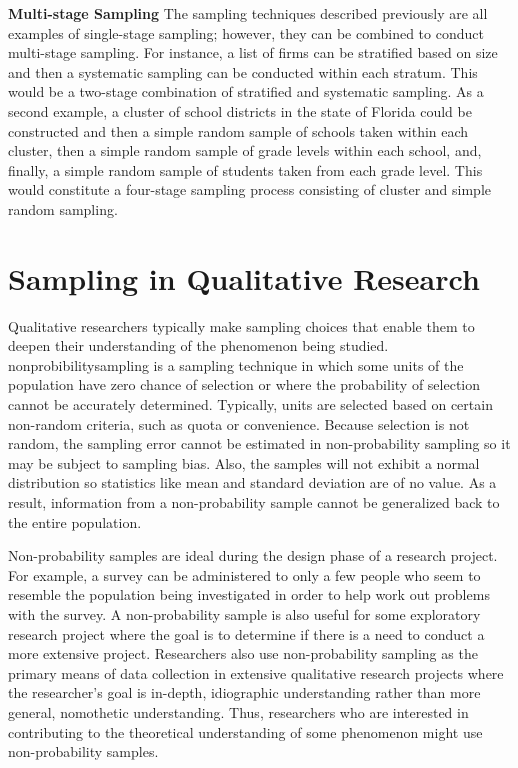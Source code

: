 \textbf{Multi-stage Sampling} The sampling techniques described previously are all examples of single-stage sampling; however, they can be combined to conduct multi-stage sampling. For instance, a list of firms can be stratified based on size and then a systematic sampling can be conducted within each stratum. This would be a two-stage combination of stratified and systematic sampling. As a second example, a cluster of school districts in the state of Florida could be constructed and then a simple random sample of schools taken within each cluster, then a simple random sample of grade levels within each school, and, finally, a simple random sample of students taken from each grade level. This would constitute a four-stage sampling process consisting of cluster and simple random sampling.

\section{Sampling in Qualitative Research}

Qualitative researchers typically make sampling choices that enable them to deepen their understanding of the phenomenon being studied. \Gls{nonprobibilitysampling} is a sampling technique in which some units of the population have zero chance of selection or where the probability of selection cannot be accurately determined. Typically, units are selected based on certain non-random criteria, such as quota or convenience. Because selection is not random, the sampling error cannot be estimated in non-probability sampling so it may be subject to sampling bias. Also, the samples will not exhibit a normal distribution so statistics like mean and standard deviation are of no value. As a result, information from a non-probability sample cannot be generalized back to the entire population. 

Non-probability samples are ideal during the design phase of a research project. For example, a survey can be administered to only a few people who seem to resemble the population being investigated in order to help work out problems with the survey. A non-probability sample is also useful for some exploratory research project where the goal is to determine if there is a need to conduct a more extensive project. Researchers also use non-probability sampling as the primary means of data collection in extensive qualitative research projects where the researcher's goal is in-depth, \gls{idiographic} understanding rather than more general, \gls{nomothetic} understanding. Thus, researchers who are interested in contributing to the theoretical understanding of some phenomenon might use non-probability samples. 

